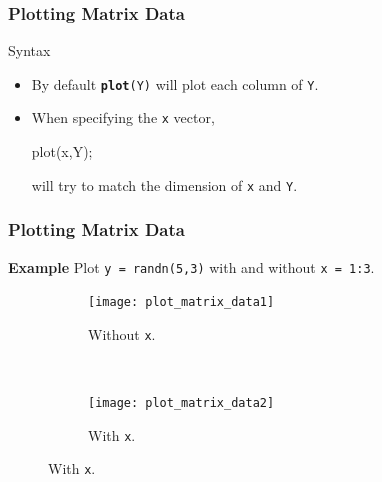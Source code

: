\documentclass{beamer}  %
\newcommand{\tttbf}[1]{\texttt{\textbf{#1}}} %
\begin{document}
\begin{frame}[fragile]
\frametitle{Plotting Matrix Data}

\begin{block}{Syntax}
\begin{itemize}[<+->]
    \item By default \tttbf{plot}\texttt{(Y)} will plot each column of \texttt{Y}.
    \item When specifying the \texttt{x} vector,
          \begin{matlabcodebeamer}[frame=none]
          plot(x,Y);
          \end{matlabcodebeamer}
          will try to match the dimension of \texttt{x} and \texttt{Y}.
\end{itemize}
\end{block}

\end{frame}
\begin{frame}[fragile]
\frametitle{Plotting Matrix Data}
\textbf{Example} 
Plot \texttt{y = randn(5,3)} with and without \texttt{x = 1:3}.\pause
\setcounter{subfigure}{0}
\begin{figure}
        \begin{subfigure}[b]{0.3\textwidth}
                \centering
               \texttt{[image: plot\_matrix\_data1]}
                \caption{Without \texttt{x}.}
        \end{subfigure}%
        ~\pause
        \begin{subfigure}[b]{0.3\textwidth}
                \centering
               \texttt{[image: plot\_matrix\_data2]}
                \caption{With \texttt{x}.}
        \end{subfigure}
\end{figure}

\end{frame}
\end{document}
